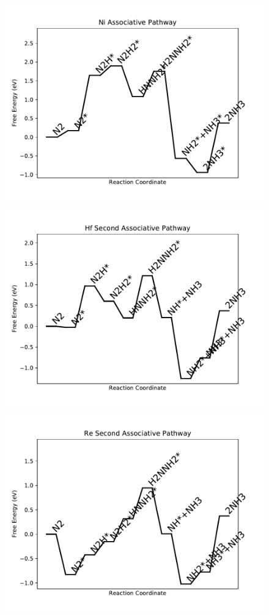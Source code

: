 \begin{figure}
\centering
\includegraphics[width=0.8\linewidth]{data/plots/Ni_associative.pdf}
\end{figure}

\begin{figure}
\centering
\includegraphics[width=0.8\linewidth]{data/plots/Hf_associative_2.pdf}
\end{figure}

\begin{figure}
\centering
\includegraphics[width=0.8\linewidth]{data/plots/Re_associative_2.pdf}
\end{figure}

